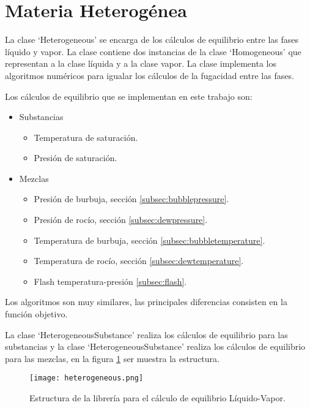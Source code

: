 \section{Materia Heterogénea}\label{sec:heterogeneous}

	La clase `Heterogeneous' se encarga de los cálculos de equilibrio entre las fases líquido y vapor. La clase contiene dos instancias de la clase `Homogeneous' que representan a la clase líquida y a la clase vapor. La clase implementa los algoritmos numéricos para igualar los cálculos de la fugacidad entre las fases.

	Los cálculos de equilibrio que se implementan en este trabajo son:

	\begin{itemize}

		\item Substancias
			\begin{itemize}
				\item Temperatura de saturación.
				\item Presión de saturación.
			\end{itemize}

		\item Mezclas
	\begin{itemize}
		\item Presión de burbuja, sección \ref{subsec:bubblepressure}.
		\item Presión de rocío, sección \ref{subsec:dewpressure}.
		\item Temperatura de burbuja, sección \ref{subsec:bubbletemperature}.
		\item Temperatura de rocío, sección \ref{subsec:dewtemperature}.
		\item Flash temperatura-presión \ref{subsec:flash}.
	\end{itemize}

	\end{itemize}

	Los algoritmos son muy similares, las principales diferencias consisten en la función objetivo.

	La clase `HeterogeneousSubstance' realiza los cálculos de equilibrio para las substancias y la clase `HeterogeneousSubstance' realiza los cálculos de equilibrio para las mezclas, en la figura \ref{fig:heterogeneous} ser muestra la estructura.

\begin{figure}[!h]
  \centering
    \texttt{[image: heterogeneous.png]}
    \caption{Estructura de la librería para el cálculo de equilibrio Líquido-Vapor.}
    \label{fig:heterogeneous}
\end{figure}


